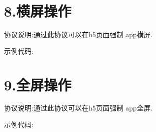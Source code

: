 \documentclass[letterpaper,10pt,english]{sphinxmanual}
\begin{document}
\section{8.横屏操作}
\label{\detokenize{bcbwallet protocol:id8}}
\begin{sphinxVerbatim}[commandchars=\\\{\}]
\end{sphinxVerbatim}

协议说明:通过此协议可以在h5页面强制 app横屏.

示例代码:

\begin{sphinxVerbatim}[commandchars=\\\{\}]
\end{sphinxVerbatim}


\section{9.全屏操作}
\label{\detokenize{bcbwallet protocol:id9}}
\begin{sphinxVerbatim}[commandchars=\\\{\}]
\end{sphinxVerbatim}

协议说明:通过此协议可以在h5页面强制 app全屏.

示例代码:

\begin{sphinxVerbatim}[commandchars=\\\{\}]
\end{sphinxVerbatim}
\end{document}
